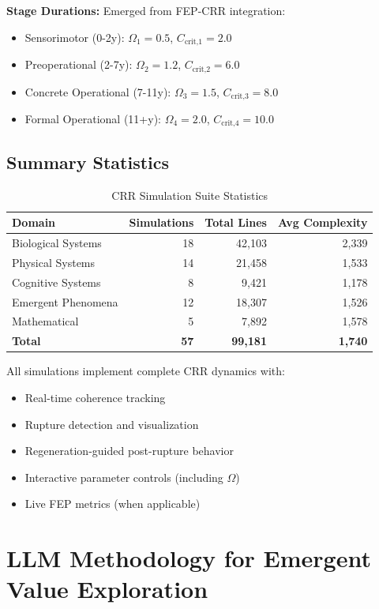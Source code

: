 \documentclass[11pt,a4paper]{article}
\theoremstyle{definition}
\theoremstyle{remark}
\begin{document}
\textbf{Stage Durations:} Emerged from FEP-CRR integration:
\begin{itemize}
\item Sensorimotor (0-2y): $\Omega_1 = 0.5$, $C_{\text{crit,1}} = 2.0$
\item Preoperational (2-7y): $\Omega_2 = 1.2$, $C_{\text{crit,2}} = 6.0$
\item Concrete Operational (7-11y): $\Omega_3 = 1.5$, $C_{\text{crit,3}} = 8.0$
\item Formal Operational (11+y): $\Omega_4 = 2.0$, $C_{\text{crit,4}} = 10.0$
\end{itemize}

\subsection{Summary Statistics}

\begin{table}[H]
\centering
\caption{CRR Simulation Suite Statistics}
\begin{tabular}{@{}lrrr@{}}
\toprule
\textbf{Domain} & \textbf{Simulations} & \textbf{Total Lines} & \textbf{Avg Complexity} \\
\midrule
Biological Systems & 18 & 42,103 & 2,339 \\
Physical Systems & 14 & 21,458 & 1,533 \\
Cognitive Systems & 8 & 9,421 & 1,178 \\
Emergent Phenomena & 12 & 18,307 & 1,526 \\
Mathematical & 5 & 7,892 & 1,578 \\
\textbf{Total} & \textbf{57} & \textbf{99,181} & \textbf{1,740} \\
\bottomrule
\end{tabular}
\end{table}

All simulations implement complete CRR dynamics with:
\begin{itemize}
\item Real-time coherence tracking
\item Rupture detection and visualization
\item Regeneration-guided post-rupture behavior
\item Interactive parameter controls (including $\Omega$)
\item Live FEP metrics (when applicable)
\end{itemize}

\section{LLM Methodology for Emergent Value Exploration}
\label{sec:llm-methodology}
\end{document}
